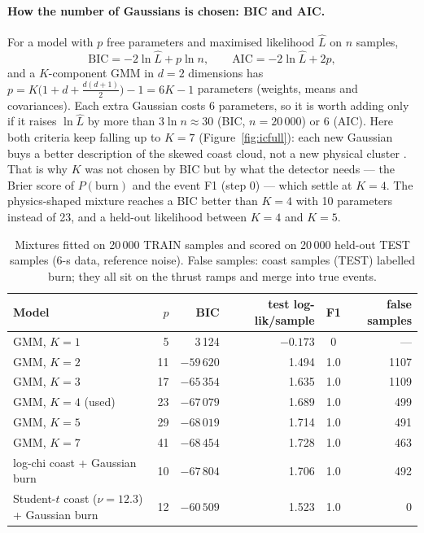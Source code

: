 \documentclass[11pt,a4paper]{article}
\begin{document}
\paragraph{How the number of Gaussians is chosen: BIC and AIC.} For a model with $p$ free parameters and maximised
likelihood $\hat L$ on $n$ samples,
\begin{equation}
  \text{BIC} = -2\ln\hat L + p\ln n,\qquad \text{AIC} = -2\ln\hat L + 2p,
\end{equation}
and a $K$-component GMM in $d = 2$ dimensions has $p = K\big(1 + d + \tfrac{d(d+1)}{2}\big) - 1 = 6K - 1$ parameters
(weights, means and covariances).
Each extra Gaussian costs 6 parameters, so it is worth adding only if it raises $\ln\hat L$ by more than
$3\ln n \approx 30$ (BIC, $n = 20\,000$) or 6 (AIC). Here both criteria keep falling up to $K = 7$
(Figure~\ref{fig:icfull}): each new Gaussian buys a better description of the skewed coast cloud, not a new physical
cluster \cite{schwarz}. That is why $K$ was not chosen by BIC but by what the detector needs --- the Brier score of
$P(\text{burn})$ and the event F1 (step 0) --- which settle at $K = 4$. The physics-shaped mixture reaches a BIC better
than $K = 4$ with 10 parameters instead of 23, and a held-out likelihood between $K = 4$ and $K = 5$.
\begin{table}[H]\centering\small
\setlength{\tabcolsep}{4pt}
\caption{Mixtures fitted on 20\,000 TRAIN samples and scored on 20\,000 held-out TEST samples (6-s data, reference noise).
False samples: coast samples (TEST) labelled burn; they all sit on the thrust ramps and merge into true events.}\label{tab:mixtures}
\begin{tabular}{lrrrcr}
\toprule
Model & $p$ & BIC & test log-lik/sample & F1 & false samples\\\midrule
GMM, $K=1$ & 5 & 3\,124 & $-0.173$ & 0 & ---\\
GMM, $K=2$ & 11 & $-59\,620$ & 1.494 & 1.0 & 1107\\
GMM, $K=3$ & 17 & $-65\,354$ & 1.635 & 1.0 & 1109\\
GMM, $K=4$ (used) & 23 & $-67\,079$ & 1.689 & 1.0 & 499\\
GMM, $K=5$ & 29 & $-68\,019$ & 1.714 & 1.0 & 491\\
GMM, $K=7$ & 41 & $-68\,454$ & 1.728 & 1.0 & 463\\
log-chi coast + Gaussian burn & 10 & $-67\,804$ & 1.706 & 1.0 & 492\\
Student-$t$ coast ($\nu{=}12.3$) + Gaussian burn & 12 & $-60\,509$ & 1.523 & 1.0 & 0\\
\bottomrule
\end{tabular}
\end{table}
\end{document}
